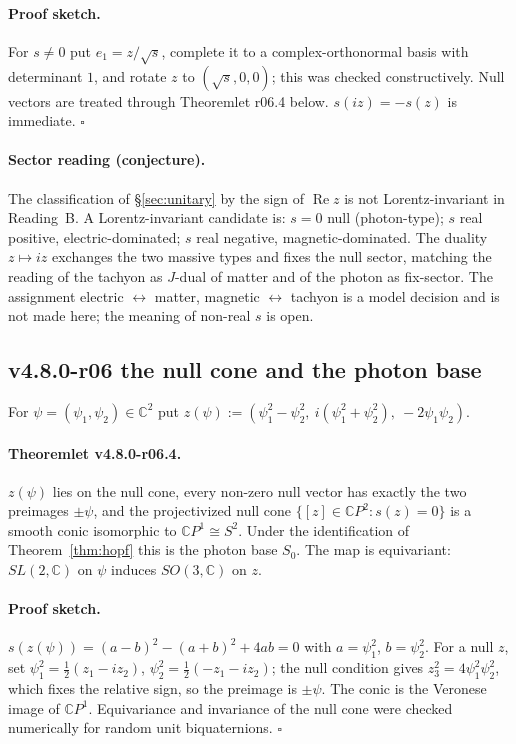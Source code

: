 \paragraph{Proof sketch.}
For \(s\neq0\) put \(e_1=z/\sqrt s\), complete it to a complex-orthonormal basis with determinant
\(1\), and rotate \(z\) to \((\sqrt s,0,0)\); this was checked constructively.  Null vectors are
treated through Theoremlet r06.4 below.  \(s(iz)=-s(z)\) is immediate.  \(\square\)

\paragraph{Sector reading (conjecture).}
The classification of \S\ref{sec:unitary} by the sign of \(\operatorname{Re}z\) is not
Lorentz-invariant in Reading~B.  A Lorentz-invariant candidate is: \(s=0\) null (photon-type);
\(s\) real positive, electric-dominated; \(s\) real negative, magnetic-dominated.  The duality
\(z\mapsto iz\) exchanges the two massive types and fixes the null sector, matching the reading of
the tachyon as \(J\)-dual of matter and of the photon as fix-sector.  The assignment
electric \(\leftrightarrow\) matter, magnetic \(\leftrightarrow\) tachyon is a model decision and is
not made here; the meaning of non-real \(s\) is open.

\subsection*{v4.8.0-r06 the null cone and the photon base}
\label{subsec:v480-r06-null-cone}

For \(\psi=(\psi_1,\psi_2)\in\mathbb C^2\) put
\(z(\psi):=(\psi_1^2-\psi_2^2,\ i(\psi_1^2+\psi_2^2),\ -2\psi_1\psi_2)\).

\paragraph{Theoremlet v4.8.0-r06.4.}
\(z(\psi)\) lies on the null cone, every non-zero null vector has exactly the two preimages
\(\pm\psi\), and the projectivized null cone \(\{[z]\in\mathbb CP^2:s(z)=0\}\) is a smooth conic
isomorphic to \(\mathbb CP^1\cong S^2\).  Under the identification of Theorem~\ref{thm:hopf} this is
the photon base \(S_0\).  The map is equivariant: \(SL(2,\mathbb C)\) on \(\psi\) induces
\(SO(3,\mathbb C)\) on \(z\).

\paragraph{Proof sketch.}
\(s(z(\psi))=(a-b)^2-(a+b)^2+4ab=0\) with \(a=\psi_1^2\), \(b=\psi_2^2\).  For a null \(z\), set
\(\psi_1^2=\tfrac12(z_1-iz_2)\), \(\psi_2^2=\tfrac12(-z_1-iz_2)\); the null condition gives
\(z_3^2=4\psi_1^2\psi_2^2\), which fixes the relative sign, so the preimage is \(\pm\psi\).  The
conic is the Veronese image of \(\mathbb CP^1\).  Equivariance and invariance of the null cone
were checked numerically for random unit biquaternions.  \(\square\)

